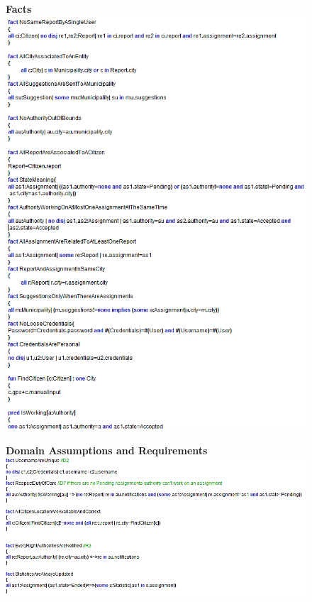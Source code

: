 


\begin{figure}[h]
\centering
\textbf{Facts}
\includegraphics{Images/alfacts.png}
\end{figure}

\begin{figure}[h]
\centering
\textbf{Domain Assumptions and Requirements}
\includegraphics[width=\textwidth]{Images/algoal.png}
\end{figure}



